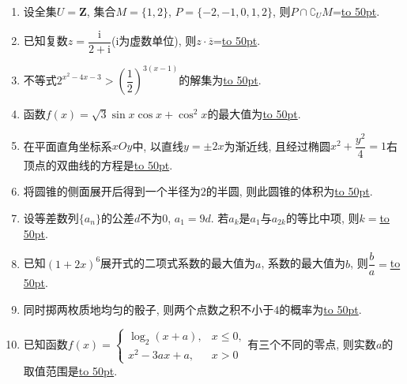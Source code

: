\documentclass[10pt,a4paper]{article}
\newcommand{\blank}[1]{\underline{\hbox to #1pt{}}}
\begin{document}
\begin{enumerate}[1.]

\item 设全集$U=\mathbf{Z}$, 集合$M=\{1,2\}$, $P=\{-2,-1,0,1,2\}$, 则$P\cap \complement_U M$=\blank{50}.
\item 已知复数$z=\dfrac{\mathrm{i}}{2+\mathrm{i}}$($\mathrm{i}$为虚数单位), 则$z\cdot \overline z$=\blank{50}.
\item 不等式$2^{x^2-4x-3}>(\dfrac12 )^{3(x-1)}$的解集为\blank{50}.
\item 函数$f(x)=\sqrt3\sin x\cos x+\cos^2x$的最大值为\blank{50}.  
\item 在平面直角坐标系$xOy$中, 以直线$y=\pm 2x$为渐近线, 且经过椭圆$x^2+\dfrac{y^2}4=1$右顶点的双曲线的方程是\blank{50}. 
\item 将圆锥的侧面展开后得到一个半径为$2$的半圆, 则此圆锥的体积为\blank{50}. 
\item 设等差数列$\{a_n\}$的公差$d$不为$0$, $a_1=9d$. 若$a_k$是$a_1$与$a_{2k}$的等比中项, 则$k=$\blank{50}.  
\item 已知$(1+2x)^6$展开式的二项式系数的最大值为$a$, 系数的最大值为$b$, 则$\dfrac ba=$\blank{50}.  
\item 同时掷两枚质地均匀的骰子, 则两个点数之积不小于$4$的概率为\blank{50}. 
\item 已知函数$f(x)=\begin{cases} \log_2 (x+a), & x\le 0, \\ x^2-3ax+a, & x>0 \end{cases}$有三个不同的零点, 则实数$a$的取值范围是\blank{50}.



\end{enumerate}
\end{document}
